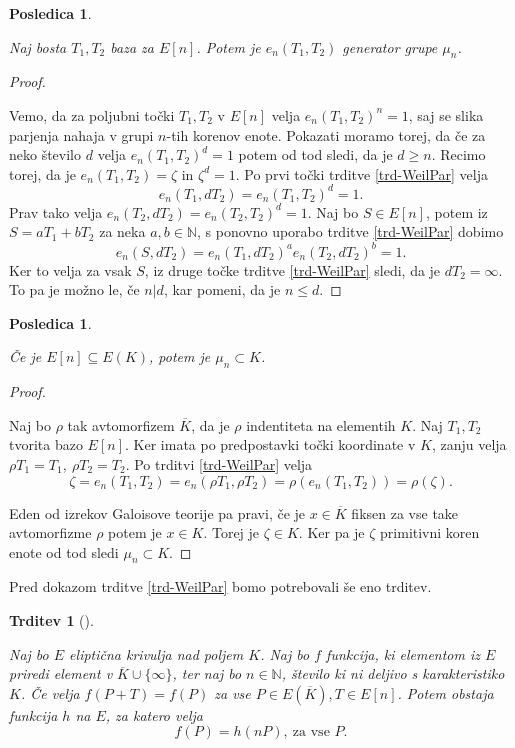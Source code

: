 \documentclass[12pt,a4paper,twoside]{article}
\theoremstyle{definition} %
\theoremstyle{plain} %
\newtheorem{trditev}[definicija]{Trditev}
\newtheorem{posledica}[definicija]{Posledica}
\numberwithin{equation}{section}  %
\newcommand{\N}{\mathbb N}
\newcommand{\E}[1]{E({#1})}
\begin{document}
\begin{posledica}~

\label{PosledicaTrdParj}
Naj bosta $T_1,T_2$ baza za $E[n]$. Potem je $e_n(T_1,T_2)$ generator grupe $\mu_n$.
\end{posledica}


\begin{proof}~

Vemo, da za poljubni točki $T_1,T_2$  v $E[n]$ velja $e_n(T_1,T_2)^n = 1$, saj se slika parjenja nahaja v grupi $n$-tih korenov enote. Pokazati moramo torej, da če za neko število $d$ velja  $e_n(T_1,T_2)^d = 1$ potem od tod sledi, da je $d \geq n$.
Recimo torej, da je $e_n(T_1,T_2) = \zeta$ in $\zeta^d = 1$.
Po prvi točki trditve \ref{trd-WeilPar} velja $$e_n(T_1,dT_2) = e_n(T_1,T_2)^d=1.$$ Prav tako velja $e_n(T_2,dT_2) = e_n(T_2,T_2)^d = 1 $. Naj bo $S \in E[n]$, potem iz $S = aT_1+bT_2$ za neka $a,b \in \N$, s ponovno uporabo trditve \ref{trd-WeilPar} dobimo
$$e_n(S,dT_2)= e_n(T_1,dT_2)^ae_n(T_2,dT_2)^b = 1. $$
Ker to velja za vsak $S$, iz druge točke trditve \ref{trd-WeilPar} sledi, da je $dT_2 = \infty$. To pa je možno le, če $n|d$, kar pomeni, da je $n \leq d$.
\end{proof}

\begin{posledica}~

Če je $E[n] \subseteq \E{K}$, potem je $\mu_n \subset K$.

\end{posledica}

\begin{proof}~

Naj bo $\rho$ tak avtomorfizem $\overline{K}$, da je $\rho$ indentiteta na elementih $K$. Naj $T_1,T_2$ tvorita bazo $E[n]$. Ker imata po predpostavki točki koordinate v $K$, zanju velja
$\rho T_1 = T_1, \ \rho T_2 = T_2$.
Po trditvi \ref{trd-WeilPar} velja
$$\zeta = e_n(T_1,T_2) = e_n(\rho T_1,\rho T_2) = \rho(e_n(T_1,T_2)) = \rho(\zeta).$$

Eden od izrekov Galoisove teorije pa pravi, če je $x \in \overline{K}$ fiksen za vse take avtomorfizme $\rho$ potem je $x\in K$. Torej je $\zeta \in K$. Ker pa je $\zeta$ primitivni koren enote od tod sledi $\mu_n \subset K$.

\end{proof}

Pred dokazom trditve \ref{trd-WeilPar} bomo potrebovali še eno trditev.
\begin{trditev}[]~
\label{trd:9.34}

Naj bo $E$ eliptična krivulja nad poljem $K$. Naj bo $f$ funkcija, ki elementom iz $E$ priredi element v $\overline{K} \cup \{ \infty \}$, ter naj bo $n \in \N$, število ki ni deljivo s karakteristiko $K$. Če velja $f(P+T) = f(P)$ za vse $P \in E(\overline{K}), T \in E[n]$. Potem obstaja funkcija $h$ na $E$, za katero velja
$$f(P) = h(nP), \ \text{za vse } P.$$

\end{trditev}
\end{document}
